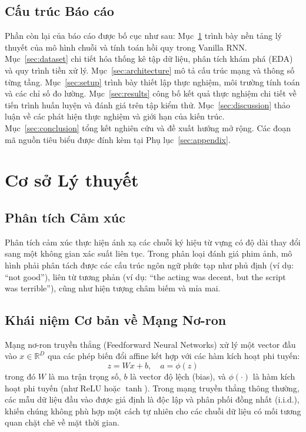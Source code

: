 \documentclass[11pt,a4paper]{article}
\begin{document}
\subsection{Cấu trúc Báo cáo}
Phần còn lại của báo cáo được bố cục như sau: Mục~\ref{sec:theory} trình bày nền tảng lý thuyết của mô hình chuỗi và tính toán hồi quy trong Vanilla RNN. Mục~\ref{sec:dataset} chi tiết hóa thống kê tập dữ liệu, phân tích khám phá (EDA) và quy trình tiền xử lý. Mục~\ref{sec:architecture} mô tả cấu trúc mạng và thông số từng tầng. Mục~\ref{sec:setup} trình bày thiết lập thực nghiệm, môi trường tính toán và các chỉ số đo lường. Mục~\ref{sec:results} công bố kết quả thực nghiệm chi tiết về tiến trình huấn luyện và đánh giá trên tập kiểm thử. Mục~\ref{sec:discussion} thảo luận về các phát hiện thực nghiệm và giới hạn của kiến trúc. Mục~\ref{sec:conclusion} tổng kết nghiên cứu và đề xuất hướng mở rộng. Các đoạn mã nguồn tiêu biểu được đính kèm tại Phụ lục~\ref{sec:appendix}.

\section{Cơ sở Lý thuyết}
\label{sec:theory}

\subsection{Phân tích Cảm xúc}
Phân tích cảm xúc thực hiện ánh xạ các chuỗi ký hiệu từ vựng có độ dài thay đổi sang một không gian xác suất liên tục. Trong phân loại đánh giá phim ảnh, mô hình phải phân tách được các cấu trúc ngôn ngữ phức tạp như phủ định (ví dụ: ``not good''), liên từ tương phản (ví dụ: ``the acting was decent, but the script was terrible''), cũng như hiện tượng châm biếm và mỉa mai.

\subsection{Khái niệm Cơ bản về Mạng Nơ-ron}
Mạng nơ-ron truyền thẳng (Feedforward Neural Networks) xử lý một vector đầu vào $x \in \mathbb{R}^D$ qua các phép biến đổi affine kết hợp với các hàm kích hoạt phi tuyến:
\begin{equation}
z = Wx + b, \quad a = \phi(z)
\end{equation}
trong đó $W$ là ma trận trọng số, $b$ là vector độ lệch (bias), và $\phi(\cdot)$ là hàm kích hoạt phi tuyến (như ReLU hoặc $\tanh$). Trong mạng truyền thẳng thông thường, các mẫu dữ liệu đầu vào được giả định là độc lập và phân phối đồng nhất (i.i.d.), khiến chúng không phù hợp một cách tự nhiên cho các chuỗi dữ liệu có mối tương quan chặt chẽ về mặt thời gian.
\end{document}
